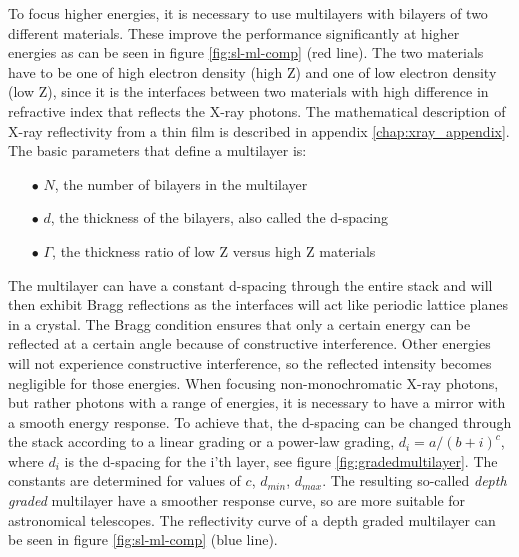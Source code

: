 To focus higher energies, it is necessary to use multilayers with bilayers of two different materials. These improve the performance significantly at higher energies as can be seen in figure \ref{fig:sl-ml-comp} (red line). The two materials have to be one of high electron density (high Z) and one of low electron density (low Z), since it is the interfaces between two materials with high difference in refractive index that reflects the X-ray photons. The mathematical description of X-ray reflectivity from a thin film is described in appendix \ref{chap:xray_appendix}. The basic parameters that define a multilayer is:

\begin{itemize}
	\item[$\bullet$] $N$, the number of bilayers in the multilayer
	\item[$\bullet$] $d$, the thickness of the bilayers, also called the d-spacing
	\item[$\bullet$] $\Gamma$, the thickness ratio of low Z versus high Z materials
\end{itemize}

The multilayer can have a constant d-spacing through the entire stack and will then exhibit Bragg reflections as the interfaces will act like periodic lattice planes in a crystal. The Bragg condition ensures that only a certain energy can be reflected at a certain angle because of constructive interference. Other energies will not experience constructive interference, so the reflected intensity becomes negligible for those energies. When focusing non-monochromatic X-ray photons, but rather photons with a range of energies, it is necessary to have a mirror with a smooth energy response. To achieve that, the d-spacing can be changed through the stack according to a linear grading or a power-law grading\cite{Joensen:12je}, $d_i = a/(b+i)^c$, where $d_i$ is the d-spacing for the i'th layer, see figure \ref{fig:gradedmultilayer}. The constants are determined for values of $c$, $d_{min}$, $d_{max}$. The resulting so-called \emph{depth graded} multilayer have a smoother response curve, so are more suitable for astronomical telescopes. The reflectivity curve of a depth graded multilayer can be seen in figure \ref{fig:sl-ml-comp} (blue line).

